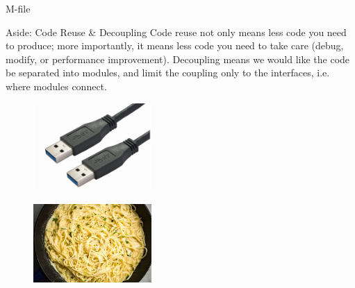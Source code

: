 \begin{frame}{M-file}

\begin{block}{Aside: Code Reuse \& Decoupling\footnotemark\footnotemark}
Code reuse not only means less code you need to produce; more importantly, it means less code you need to take care (debug, modify, or performance improvement). Decoupling means we would like the code be separated into modules, and limit the coupling only to the interfaces, i.e. where modules connect.
\end{block}
\begin{minipage}{0.48\textwidth}
	\begin{figure}
		\centering
		\includegraphics[width=0.4\textwidth]{pic/low-coupling.jpg}
	\end{figure}
\end{minipage}
\begin{minipage}{0.48\textwidth}
	\begin{figure}
		\centering
		\includegraphics[width=0.4\textwidth]{pic/high-coupling.jpg}
	\end{figure}
\end{minipage}
\end{frame}